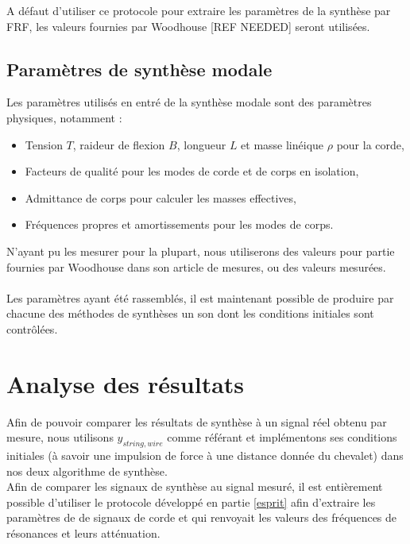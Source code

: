 A défaut d'utiliser ce protocole pour extraire les paramètres de la synthèse par FRF, les valeurs fournies par Woodhouse [REF NEEDED] seront utilisées.

\subsection{Paramètres de synthèse modale}

Les paramètres utilisés en entré de la synthèse modale sont des paramètres physiques, notamment :
\begin{itemize}
 \item Tension \( T \), raideur de flexion \( B \), longueur \( L \) et
  masse linéique \( \rho \) pour la corde,
 \item Facteurs de qualité pour les modes de corde et de corps en isolation,
 \item Admittance de corps pour calculer les masses effectives,
 \item Fréquences propres et amortissements pour les modes de corps.
\end{itemize}
N'ayant pu les mesurer pour la plupart, nous utiliserons des valeurs pour
partie fournies par Woodhouse dans son article de mesures,
ou des valeurs mesurées.
\\\\

Les paramètres ayant été rassemblés, il est maintenant possible de produire par chacune des méthodes de synthèses un son dont les conditions initiales sont contrôlées.

\section{Analyse des résultats}
Afin de pouvoir comparer les résultats de synthèse à un signal réel obtenu par mesure, nous utilisons $y_{string,wire}$ comme référant et implémentons ses conditions initiales (à savoir une impulsion de force à une distance donnée du chevalet) dans nos deux algorithme de synthèse.\\
Afin de comparer les signaux de synthèse au signal mesuré, il est entièrement possible d'utiliser le protocole développé en partie \ref{esprit} afin d'extraire les paramètres de de signaux de corde et qui renvoyait les valeurs des fréquences de résonances et leurs atténuation.\\

